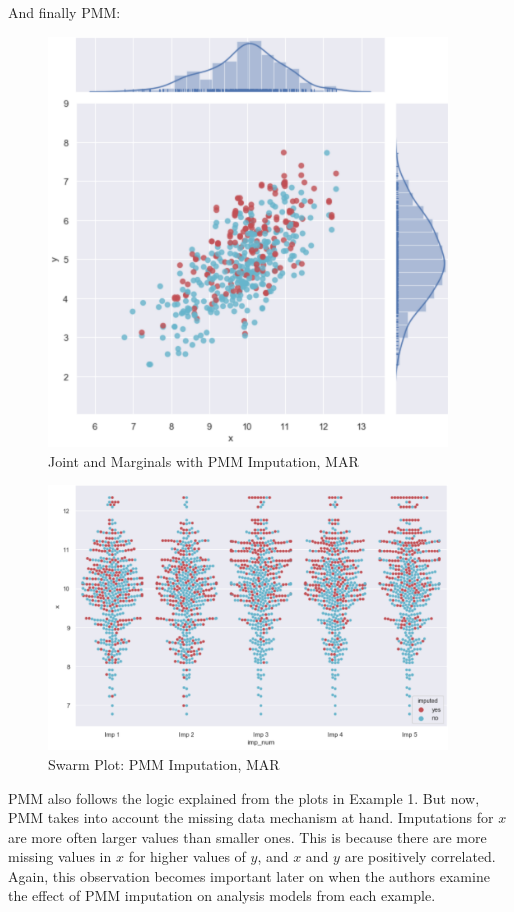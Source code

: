 \documentclass[12pt,oneside]{chicagocapstone}
\begin{document}
And finally PMM:
\begin{figure}

{\centering \includegraphics[width=400px]{figure/multi-pmm-mar} 

}

\caption{Joint and Marginals with PMM Imputation, MAR}\label{fig:multi-pmm-mar}
\end{figure}
\begin{figure}

{\centering \includegraphics[width=400px]{figure/swarm-pmm-mar} 

}

\caption{Swarm Plot: PMM Imputation, MAR}\label{fig:swarm-pmm-mar}
\end{figure}
PMM also follows the logic explained from the plots in Example 1. But
now, PMM takes into account the missing data mechanism at hand.
Imputations for \(x\) are more often larger values than smaller ones.
This is because there are more missing values in \(x\) for higher values
of \(y\), and \(x\) and \(y\) are positively correlated. Again, this
observation becomes important later on when the authors examine the
effect of PMM imputation on analysis models from each example.
\end{document}
